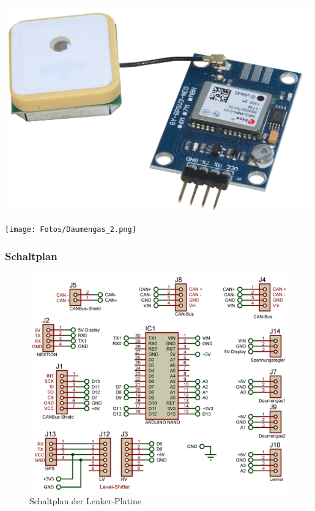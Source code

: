 \vspace{0.5cm}
\begin{minipage}{7.5cm}
    \centering
    \includegraphics[width=0.99\textwidth]{Fotos/GPS_Modul_2.png}
\end{minipage}
\hspace{0.1cm}
\begin{minipage}{7.5cm}
    \centering
    \texttt{[image: Fotos/Daumengas\_2.png]}
\end{minipage}

\newpage

\subsubsection{Schaltplan}
\begin{figure}[h]
    \centering
    \includegraphics[width=1.0\textwidth]{../Proteus/Exports/Lenker-Platine.png}    
    \caption{Schaltplan der Lenker-Platine}
\end{figure}

